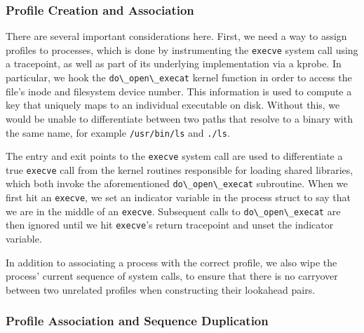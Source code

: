 \documentclass[
  12pt]{findlay}
\begin{document}
\hypertarget{profile-creation-and-association}{%
\subsubsection{Profile Creation and
Association}\label{profile-creation-and-association}}

There are several important considerations here. First, we need a way to
assign profiles to processes, which is done by instrumenting the
\passthrough{\lstinline!execve!} system call using a tracepoint, as well
as part of its underlying implementation via a kprobe. In particular, we
hook the \passthrough{\lstinline!do\_open\_execat!} kernel function in
order to access the file's inode and filesystem device number. This
information is used to compute a key that uniquely maps to an individual
executable on disk. Without this, we would be unable to differentiate
between two paths that resolve to a binary with the same name, for
example \passthrough{\lstinline!/usr/bin/ls!} and
\passthrough{\lstinline!./ls!}.

The entry and exit points to the \passthrough{\lstinline!execve!} system
call are used to differentiate a true \passthrough{\lstinline!execve!}
call from the kernel routines responsible for loading shared libraries,
which both invoke the aforementioned
\passthrough{\lstinline!do\_open\_execat!} subroutine. When we first hit
an \passthrough{\lstinline!execve!}, we set an indicator variable in the
process struct to say that we are in the middle of an
\passthrough{\lstinline!execve!}. Subsequent calls to
\passthrough{\lstinline!do\_open\_execat!} are then ignored until we hit
\passthrough{\lstinline!execve!}'s return tracepoint and unset the
indicator variable.

In addition to associating a process with the correct profile, we also
wipe the process' current sequence of system calls, to ensure that there
is no carryover between two unrelated profiles when constructing their
lookahead pairs.

\hypertarget{profile-association-and-sequence-duplication}{%
\subsubsection{Profile Association and Sequence
Duplication}\label{profile-association-and-sequence-duplication}}
\end{document}
